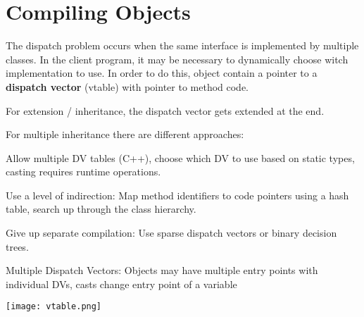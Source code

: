 \section*{Compiling Objects}

The dispatch problem occurs when the same interface is implemented by multiple classes. In the client program, it may be necessary to dynamically choose witch implementation to use. In order to do this, object contain a pointer to a \textbf{dispatch vector} (vtable) with pointer to method code. \medskip

For extension / inheritance, the dispatch vector gets extended at the end.\medskip

For multiple inheritance there are different approaches:
\begin{compactitem}[$\quad\bullet$]
	\item Allow multiple DV tables (C++), choose which DV to use based on static types, casting requires runtime operations.

	\item Use a level of indirection: Map method identifiers to code pointers using a hash table, search up through the class hierarchy.

	\item Give up separate compilation: Use sparse dispatch vectors or binary decision trees.
\end{compactitem}

Multiple Dispatch Vectors: Objects may have multiple entry points with individual DVs, casts change entry point of a variable
\vspace{-8pt}
\begin{center}
	\texttt{[image: vtable.png]}
\end{center}
\vspace{-20pt}

